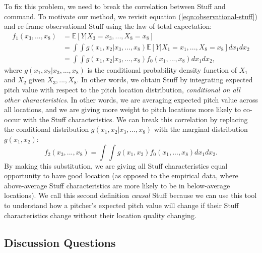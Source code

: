 \documentclass{article}
\begin{document}
    To fix this problem, we need to break the correlation between Stuff and command. To motivate our method, we revisit equation (\ref{eqn:observational-stuff}) and re-frame observational Stuff using the law of total expectation:
    \begin{align*}
      f_1(x_3, ..., x_8)  &= \mathbb{E}[Y | X_3 = x_3, ..., X_8 = x_8]\\
                          &= \int \int g(x_1, x_2 | x_3, ..., x_8) \mathbb{E}[Y | X_1 = x_1, ..., X_8 = x_8] dx_1 dx_2\\
                          &= \int \int g(x_1, x_2 | x_3, ..., x_8) f_0(x_1, ..., x_8) dx_1 dx_2,
    \end{align*}
    where $g(x_1, x_2 | x_3, ..., x_8)$ is the conditional probability density function of $X_1$ and $X_2$ given $X_3, ..., X_8$. In other words, we obtain Stuff by integrating expected pitch value with respect to the pitch location distribution, {\it conditional on all other characteristics}. In other words, we are averaging expected pitch value across all locations, and we are giving more weight to pitch locations more likely to co-occur with the Stuff characteristics. We can break this correlation by replacing the conditional distribution $g(x_1, x_2 | x_3, ..., x_8)$ with the marginal distribution $g(x_1, x_2)$:
    \begin{equation*}
      f_2(x_3, ..., x_8)  = \int \int g(x_1, x_2) f_0(x_1, ..., x_8) dx_1 dx_2.
    \end{equation*}
    By making this substitution, we are giving all Stuff characteristics equal opportunity to have good location (as opposed to the empirical data, where above-average Stuff characteristics are more likely to be in below-average locations). We call this second definition {\it causal} Stuff because we can use this tool to understand how a pitcher's expected pitch value will change if their Stuff characteristics change without their location quality changing.

  \subsection{\sc Discussion Questions}
\end{document}
